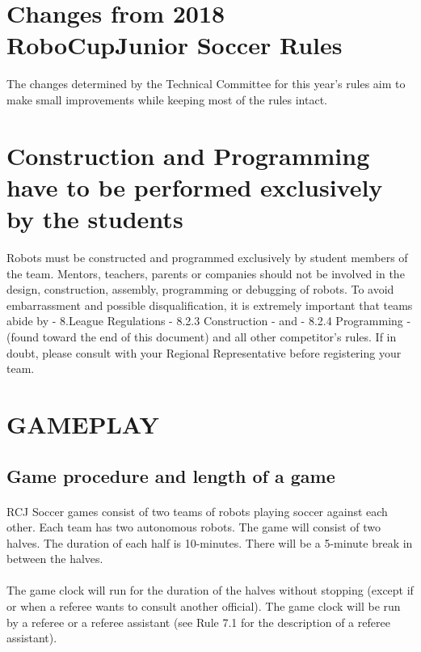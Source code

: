 \documentclass{article}
\newcommand*{\p}{\paragraph{}}
\begin{document}
\section*{Changes from 2018 RoboCupJunior Soccer Rules}

The changes determined by the Technical Committee for this year's rules aim to
make small improvements while keeping most of the rules intact.

\listofchanges

\section*{Construction and Programming have to be performed exclusively by the students}

Robots must be constructed and programmed exclusively by student members of the
team. Mentors, teachers, parents or companies should not be involved in the
design, construction, assembly, programming or debugging of robots. To avoid
embarrassment and possible disqualification, it is extremely important that
teams abide by - 8.League Regulations - 8.2.3 Construction - and - 8.2.4
Programming - (found toward the end of this document) and all other
competitor's rules. If in doubt, please consult with your Regional
Representative before registering your team.

\newpage

\tableofcontents

\newpage

\section{GAMEPLAY \label{ref-001}}

\subsection{Game procedure and length of a game \label{ref-002}}

\p RCJ Soccer games consist of two teams of robots playing soccer against
each other. Each team has two autonomous robots. The game will consist of two
halves. The duration of each half is 10-minutes. There will be a 5-minute break
in between the halves.

\p The game clock will run for the duration of the halves without stopping (except
if or when a referee wants to consult another official). The game clock will be run
by a referee or a referee assistant (see Rule 7.1 for the description of a
referee assistant).
\end{document}
